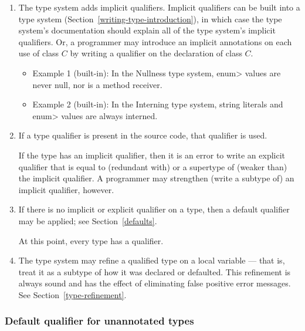 \begin{enumerate}
\item
  The type system adds implicit qualifiers.  Implicit qualifiers can be
  built into a type system (Section~\ref{writing-type-introduction}), in
  which case the type system's documentation should explain all of the type
  system's implicit qualifiers.  Or, a programmer may introduce an implicit
  annotations on each use of class $C$ by writing a qualifier on the
  declaration of class $C$.

\begin{itemize}
\item
  Example 1 (built-in):  In the Nullness type system,
  \<enum> values are never null, nor is a method receiver.
\item
  Example 2 (built-in):  In the Interning type system, string literals
  and \<enum> values are always interned.
\end{itemize}

\item
  If a type qualifier is present in the source code, that qualifier is used.

  If the type has an implicit qualifier, then it is an error to write an
  explicit qualifier that is equal to (redundant with) or a supertype of
  (weaker than) the implicit qualifier.  A programmer may strengthen
  (write a subtype of) an implicit qualifier, however.

\item
  If there is no implicit or explicit qualifier on a type, then a default
  qualifier may be applied; see Section~\ref{defaults}.  

  \smallskip

  At this point, every type has a qualifier.

\item
  The type system may refine a qualified type on a local variable --- that
  is, treat it as a subtype of how it was declared or defaulted.  This
  refinement is always sound and has the effect of eliminating false
  positive error messages.  See Section~\ref{type-refinement}.


\end{enumerate}



\subsubsection{Default qualifier for unannotated types\label{defaults}}

